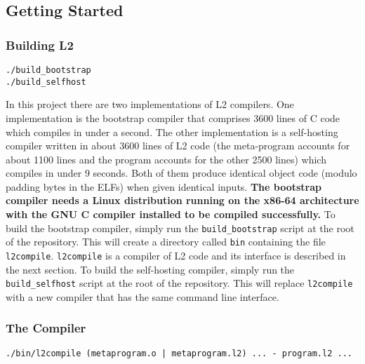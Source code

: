 \documentclass[]{article}
\begin{document}
\hypertarget{getting-started}{%
\subsection{Getting Started}\label{getting-started}}

\hypertarget{building-l2}{%
\subsubsection{Building L2}\label{building-l2}}

\begin{verbatim}
./build_bootstrap
./build_selfhost
\end{verbatim}

In this project there are two implementations of L2 compilers. One
implementation is the bootstrap compiler that comprises 3600 lines of C
code which compiles in under a second. The other implementation is a
self-hosting compiler written in about 3600 lines of L2 code (the
meta-program accounts for about 1100 lines and the program accounts for
the other 2500 lines) which compiles in under 9 seconds. Both of them
produce identical object code (modulo padding bytes in the ELFs) when
given identical inputs. \textbf{The bootstrap compiler needs a Linux
distribution running on the x86-64 architecture with the GNU C compiler
installed to be compiled successfully.} To build the bootstrap compiler,
simply run the \texttt{build\_bootstrap} script at the root of the
repository. This will create a directory called \texttt{bin} containing
the file \texttt{l2compile}. \texttt{l2compile} is a compiler of L2 code
and its interface is described in the next section. To build the
self-hosting compiler, simply run the \texttt{build\_selfhost} script at
the root of the repository. This will replace \texttt{l2compile} with a
new compiler that has the same command line interface.

\hypertarget{the-compiler}{%
\subsubsection{The Compiler}\label{the-compiler}}

\begin{verbatim}
./bin/l2compile (metaprogram.o | metaprogram.l2) ... - program.l2 ...
\end{verbatim}
\end{document}
